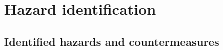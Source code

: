 \section{Hazard identification}
\label{chapter4}

\subsection{Identified hazards and countermeasures}


%
%


